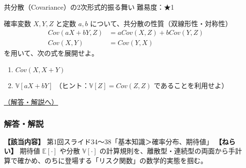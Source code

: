 \begin{questionbox}[label=q:1-1-4]{共分散（Covariance）の2次形式的振る舞い \hfill \normalfont \small 難易度：★1}

確率変数 \(X, Y, Z\) と定数 \(a, b\)
について、共分散の性質（双線形性・対称性） \begin{align*}
Cov(aX+bY, Z) &= a Cov(X,Z) + b Cov(Y,Z) \\
Cov(X,Y) &= Cov(Y,X)
\end{align*} を用いて、次の式を展開せよ。

\begin{enumerate}
\def\labelenumi{\arabic{enumi}.}
\tightlist
\item
  \(Cov(X, X+Y)\)
\item
  \(\mathbb{V}[aX + bY]\) （ヒント：\(\mathbb{V}[Z] = Cov(Z,Z)\)
  であることを利用せよ）
\end{enumerate}

\hfill 

\hyperref[a:1-1-4]{（解答・解説へ）}

\end{questionbox}

\subsubsection{解答・解説}\label{ux89e3ux7b54ux89e3ux8aac}

\textbf{【該当内容】} 第1回スライド34〜38「基本知識＞確率分布、期待値」
\textbf{【ねらい】} 期待値 \(\mathbb{E}[\cdot]\) や分散
\(\mathbb{V}[\cdot]\)
の計算規則を、離散型・連続型の両面から手計算で確かめ、のちに登場する「リスク関数」の数学的実態を掴む。

